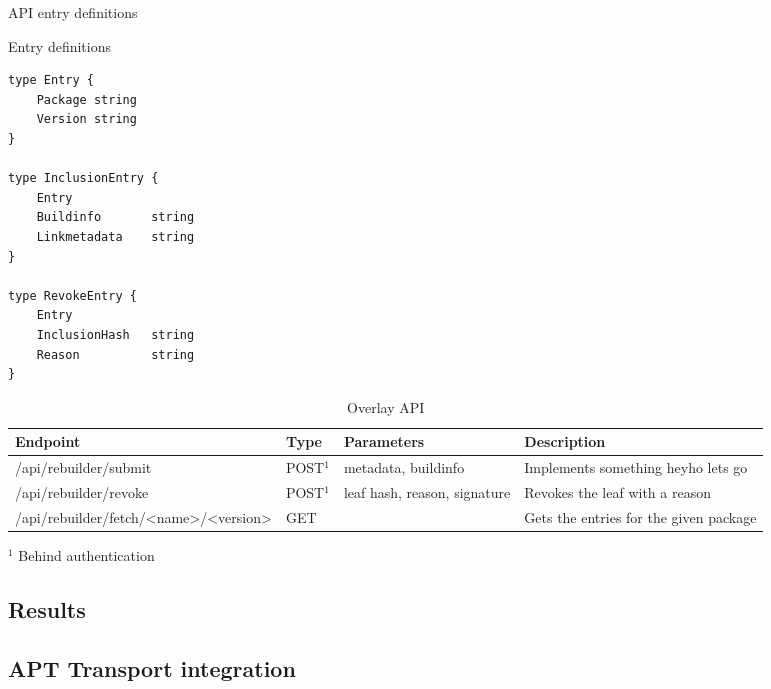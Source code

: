 \documentclass[../Main/thesis.tex]{subfiles}
\begin{document}
API entry definitions

\begin{listing}[H]
\caption{Entry definitions}
\label{lst:entrydefinitions}
\begin{verbatim}
type Entry {
    Package string
    Version string
} 

type InclusionEntry {
    Entry
    Buildinfo       string
    Linkmetadata    string
}

type RevokeEntry {
    Entry 
    InclusionHash   string
    Reason          string
}
\end{verbatim}
\end{listing}


\begin{table}[hbtp]
\footnotesize
\centering
\settowidth{}
\setlength\extrarowheight{2pt}
\begin{tabulary}{1.0\textwidth}{|l|L|L|L|}
\hline
    \textbf{Endpoint} & 
    \textbf{Type} & 
    \textbf{Parameters} & 
    \textbf{Description} \\
\hline
    /api/rebuilder/submit & POST$^1$ & metadata, buildinfo& Implements something heyho lets go \\  \hline
    /api/rebuilder/revoke& POST$^1$ & leaf hash, reason, signature& Revokes the leaf with a reason  \\  \hline
    /api/rebuilder/fetch/<name>/<version>& GET & & Gets the entries for the given package \\  \hline
\end{tabulary}
\footnotesize{$^1$ Behind authentication}\\
\caption{Overlay API}
\label{api:Overlay API}
\end{table}

\subsection*{Results}%
\label{sub:fourth_iteration_results}


\subsection{APT Transport integration}\label{sec:apt_transport}
\end{document}
